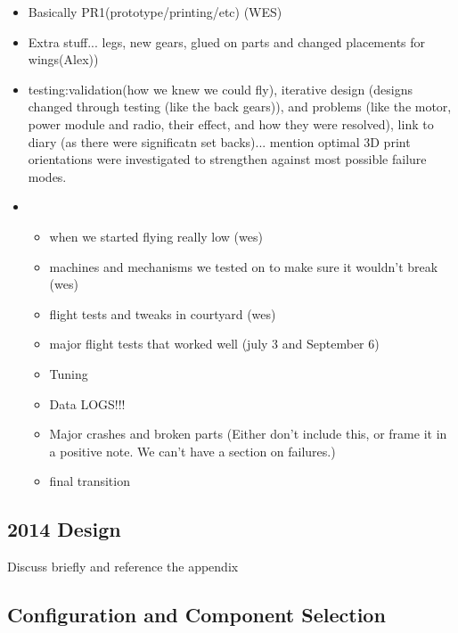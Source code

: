 \color{red}
\begin{itemize}
\item Basically PR1(prototype/printing/etc) (WES)
\item Extra stuff... legs, new gears, glued on parts and changed placements for wings(Alex))
\item testing:validation(how we knew we could fly), iterative design (designs changed through testing (like the back gears)), and problems (like the motor, power module and radio, their effect, and how they were resolved), link to diary (as there were significatn set backs)... mention optimal 3D print orientations were investigated to strengthen against most possible failure modes.
\item \begin{itemize}
	\item when we started flying really low (wes) 
	\item machines and mechanisms we tested on to make sure it wouldn’t break (wes) 
	\item flight tests and tweaks in courtyard (wes) 
	\item major flight tests that worked well (july 3 and September 6) 
	\item Tuning 
	\item Data LOGS!!! 
	\item Major crashes and broken parts (Either don't include this, or frame it in a positive note. We can't have a section on failures.)
	\item final transition
\end{itemize}
\end{itemize}
\color{black}

\subsection{2014 Design}
Discuss briefly and reference the appendix 
 
\subsection{Configuration and Component Selection}


